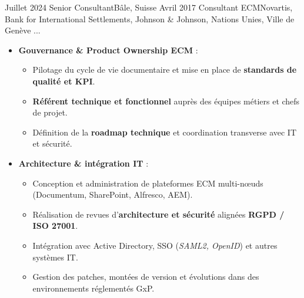 %
%
%

\begin{experiences}

\consultantexperience
    {Juillet 2024} {Senior Consultant}{}{Bâle, Suisse}
    {Avril 2017}    {Consultant ECM}{Novartis, Bank for International Settlements, Johnson \& Johnson, Nations Unies, Ville de Genève ...} {
        \begin{itemize}[left=0pt,label={},itemsep=0.5em]
        \vspace{0.3em}  %
          \item \textbf{Gouvernance \& Product Ownership ECM} :
            \begin{itemize}[itemsep=0.2em,topsep=0.2em,parsep=0pt]
              \small
              \item Pilotage du cycle de vie documentaire et mise en place de \textbf{standards de qualité et KPI}.
              \item \textbf{Référent technique et fonctionnel} auprès des équipes métiers et chefs de projet.
              \item Définition de la \textbf{roadmap technique} et coordination transverse avec IT et sécurité.
            \end{itemize}

          \item \textbf{Architecture \& intégration IT} :
            \begin{itemize}[itemsep=0.2em,topsep=0.2em,parsep=0pt]
              \small
              \item Conception et administration de plateformes ECM multi-nœuds (Documentum, SharePoint, Alfresco, AEM).
              \item Réalisation de revues d’\textbf{architecture et sécurité} alignées \textbf{RGPD / ISO 27001}.
              \item Intégration avec Active Directory, SSO (\textit{SAML2, OpenID}) et autres systèmes IT.
              \item Gestion des patches, montées de version et évolutions dans des environnements réglementés GxP.
            \end{itemize}


\end{itemize}}
\end{experiences}
